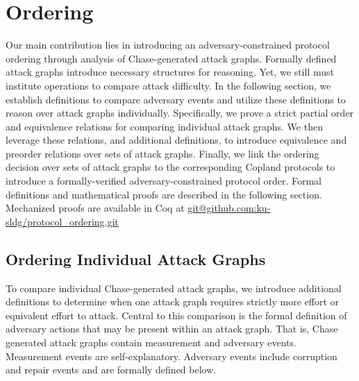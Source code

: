 \documentclass[runningheads]{llncs}
\theoremstyle{definition}
\begin{document}


\section{Ordering}

Our main contribution lies in introducing an adversary-constrained protocol ordering through analysis of Chase-generated attack graphs. Formally defined attack graphs introduce necessary structures for reasoning. Yet, we still must institute operations to compare attack difficulty. In the following section, we establish definitions to compare adversary events and utilize these definitions to reason over attack graphs individually. Specifically, we prove a strict partial order and equivalence relations for comparing individual attack graphs. We then leverage these relations, and additional definitions, to introduce equivalence and preorder relations over sets of attack graphs. Finally, we link the ordering decision over sets of attack graphs to the corresponding Copland protocols to introduce a formally-verified adversary-constrained protocol order. Formal definitions and mathematical proofs are described in the following section. Mechanized proofs are available in Coq at \url{git@github.com:ku-sldg/protocol_ordering.git}

\subsection*{Ordering Individual Attack Graphs}

To compare individual Chase-generated attack graphs, we introduce additional definitions to determine when one attack graph requires strictly more effort or equivalent effort to attack. Central to this comparison is the formal definition of adversary actions that may be present within an attack graph. That is, Chase generated attack graphs contain measurement and adversary events. Measurement events are self-explanatory. Adversary events include corruption and repair events and are formally defined below.

\end{document}
